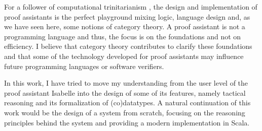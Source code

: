 \documentclass[notitlepage]{article}
\begin{document}
For a follower of computational trinitarianism \cite{trinity}, the design and implementation of proof assistants is the perfect playground mixing logic, language design and, as we have seen here, some notions of category theory. A proof assistant is not a programming language and thus, the focus is on the foundations and not on efficiency. I believe that category theory contributes to clarify these foundations and that some of the technology developed for proof assistants may influence future programming languages or software verifiers. 

In this work, I have tried to move my understanding from the user level of the proof assistant Isabelle into the design of some of its features, namely tactical reasoning and its formalization of (co)datatypes. A natural continuation of this work would be the design of a system from scratch, focusing on the reasoning principles behind the system and providing a modern implementation in Scala. 


\newpage
\printbibliography
\end{document}
